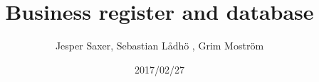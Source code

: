 \documentclass[11pt]{article}
\begin{document}
\title{Business register and database}
\author{Jesper Saxer, Sebastian Lådhö , Grim Moström}
\date{2017/02/27}
\maketitle
\end{document}
